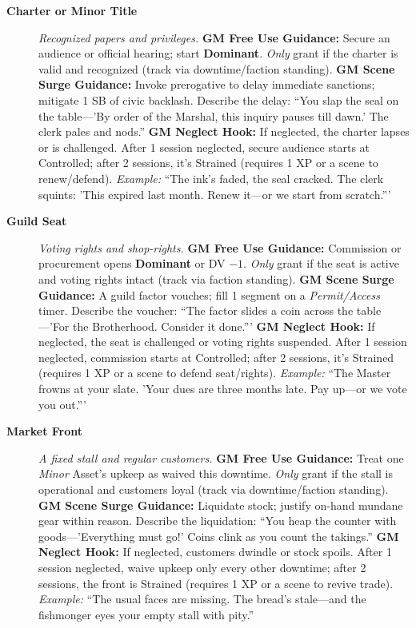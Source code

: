 \begin{description}
  \item[\textbf{Charter or Minor Title}]   
        \emph{Recognized papers and privileges.}  
        \textbf{GM Free Use Guidance:} Secure an audience or official hearing; start \textbf{Dominant}. \emph{Only} grant if the charter is valid and recognized (track via downtime/faction standing).  
        \textbf{GM Scene Surge Guidance:} Invoke prerogative to delay immediate sanctions; mitigate 1 SB of civic backlash. Describe the delay: ``You slap the seal on the table---'By order of the Marshal, this inquiry pauses till dawn.' The clerk pales and nods.''  
        \textbf{GM Neglect Hook:} If neglected, the charter lapses or is challenged. After 1 session neglected, secure audience starts at Controlled; after 2 sessions, it's Strained (requires 1 XP or a scene to renew/defend).  
        \textit{Example:} ``The ink's faded, the seal cracked. The clerk squints: 'This expired last month. Renew it---or we start from scratch.'''  

  \item[\textbf{Guild Seat}]   
        \emph{Voting rights and shop-rights.}  
        \textbf{GM Free Use Guidance:} Commission or procurement opens \textbf{Dominant} or DV $-1$. \emph{Only} grant if the seat is active and voting rights intact (track via faction standing).  
        \textbf{GM Scene Surge Guidance:} A guild factor vouches; fill 1 segment on a \emph{Permit/Access} timer. Describe the voucher: ``The factor slides a coin across the table---'For the Brotherhood. Consider it done.'''  
        \textbf{GM Neglect Hook:} If neglected, the seat is challenged or voting rights suspended. After 1 session neglected, commission starts at Controlled; after 2 sessions, it's Strained (requires 1 XP or a scene to defend seat/rights).  
        \textit{Example:} ``The Master frowns at your slate. 'Your dues are three months late. Pay up---or we vote you out.'''  

  \item[\textbf{Market Front}]   
        \emph{A fixed stall and regular customers.}  
        \textbf{GM Free Use Guidance:} Treat one \emph{Minor} Asset's upkeep as waived this downtime. \emph{Only} grant if the stall is operational and customers loyal (track via downtime/faction standing).  
        \textbf{GM Scene Surge Guidance:} Liquidate stock; justify on-hand mundane gear within reason. Describe the liquidation: ``You heap the counter with goods---'Everything must go!' Coins clink as you count the takings.''  
        \textbf{GM Neglect Hook:} If neglected, customers dwindle or stock spoils. After 1 session neglected, waive upkeep only every other downtime; after 2 sessions, the front is Strained (requires 1 XP or a scene to revive trade).  
        \textit{Example:} ``The usual faces are missing. The bread's stale---and the fishmonger eyes your empty stall with pity.''  


\end{description}
